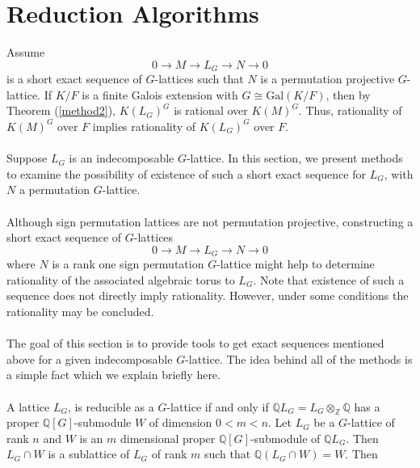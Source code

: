 \documentclass[a4paper, 14pt]{extarticle}
\theoremstyle{plain}
\theoremstyle{definition}
\newcommand{\Z}{\ensuremath{\mathbb{Z}}}
\newcommand{\Q}{\ensuremath{\mathbb{Q}}}
\begin{document}
\section{Reduction Algorithms}
Assume $$0 \rightarrow M  \rightarrow L_G \rightarrow N \rightarrow 0$$ is a short 
exact sequence of $G$-lattices such that $N$ is a permutation projective $G$-lattice. 
If $K/F$ is a finite Galois extension with $G \cong \mathrm{Gal}(K/F)$, then by 
Theorem (\ref{method2}), $K(L_G)^G$ is rational over $K(M)^G$. Thus, rationality 
of $K(M)^G$ over $F$ implies rationality of $K(L_G)^G$ over $F$.\\
\\
Suppose $L_G$ is an indecomposable $G$-lattice. In this section, we present methods 
to examine the possibility of existence of such a short exact sequence for $L_G$, with
 $N$ a permutation $G$-lattice.\\
\\
Although sign permutation lattices are not permutation projective, constructing a 
short exact sequence of $G$-lattices $$0 \rightarrow M  \rightarrow L_G \rightarrow N \rightarrow 0$$ 
where $N$ is a rank one sign permutation $G$-lattice might help to determine 
rationality of the associated algebraic torus to $L_G$. Note that existence of 
such a sequence does not directly imply rationality. However, under some conditions 
the rationality may be concluded. \\
\\
The goal of this section is to provide tools to get exact sequences mentioned above 
for a given indecomposable $G$-lattice. The idea behind all of the methods is a simple 
fact which we explain briefly here.  \\
\\
A lattice $L_G$, is reducible as a $G$-lattice if and only if $\Q L_G = L_G \otimes_{\Z} \Q$ 
has a proper $\Q[G]$-submodule $W$ of dimension $0 < m < n$. Let $L_G$ be a $G$-lattice of 
rank $n$ and $W$ is an $m$ dimensional proper $\Q[G]$-submodule of $\Q L_G$. Then $L_G \cap W$ 
is a sublattice of $L_G$ of rank $m$ such that $\Q (L_G \cap W) = W$. Then
\end{document}
